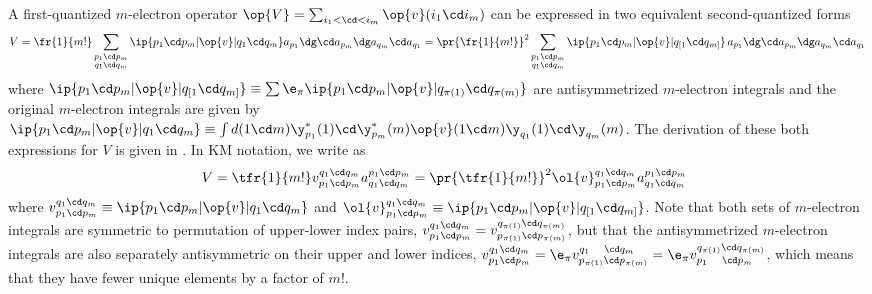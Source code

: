 \documentclass[11pt,fleqn]{article}
\numberwithin{equation}{section}
\begin{document}
\begin{rmk}
A first-quantized $m$-electron operator $\op{V}=\sum_{i_1<\cd<i_m}\op{v}(i_1\cd i_m)$ can be expressed in two equivalent second-quantized forms
\begin{align}\label{m-electron-operator-expressions}
  V
=
  \fr{1}{m!}
  \sum_{\substack{p_1\cd p_m\\q_1\cd q_m}}
  \ip{p_1\cd p_m|\op{v}|q_1\cd q_m}
  a_{p_1}\dg\cd a_{p_m}\dg a_{q_m}\cd a_{q_1}
=
  \pr{\fr{1}{m!}}^2
  \sum_{\substack{p_1\cd p_m\\q_1\cd q_m}}
  \ip{p_1\cd p_m|\op{v}|q_{[1}\cd q_{m]}}\,
  a_{p_1}\dg\cd a_{p_m}\dg
  a_{q_m}\cd a_{q_1}
\end{align}
where
$
  \ip{p_1\cd p_m|\op{v}|q_{[1}\cd q_{m]}}
\equiv
  \sum
  \e_{\pi}
  \ip{p_1\cd p_m|\op{v}|q_{\pi(1)}\cd q_{\pi(m)}}
$
are antisymmetrized $m$-electron integrals
and the original $m$-electron integrals are given by
$\ip{p_1\cd p_m|\op{v}|q_1\cd q_m}\equiv\int d(1\cd m)\y_{p_1}^*(1)\cd \y_{p_m}^*(m)\op{v}(1\cd m)\y_{q_1}(1)\cd \y_{q_m}(m)$.
The derivation of these both expressions for $V$ is given in .
In KM notation, we write  as
\begin{align}
&&
  V
=
  \tfr{1}{m!}
  v_{p_1\cd p_m}^{q_1\cd q_m}
  a^{p_1\cd p_m}_{q_1\cd q_m}
=
  \pr{\tfr{1}{m!}}^2
  \ol{v}_{p_1\cd p_m}^{q_1\cd q_m}
  a^{p_1\cd p_m}_{q_1\cd q_m}
\end{align}
where $v_{p_1\cd p_m}^{q_1\cd q_m}\equiv\ip{p_1\cd p_m|\op{v}|q_1\cd q_m}$ and
$\ol{v}_{p_1\cd p_m}^{q_1\cd q_m}\equiv\ip{p_1\cd p_m|\op{v}|q_{[1}\cd q_{m]}}$.
Note that both sets of $m$-electron integrals are symmetric to permutation of upper-lower index pairs, $v_{p_1\cd p_m}^{q_1\cd q_m}=v_{p_{\pi(1)}\cd p_{\pi(m)}}^{q_{\pi(1)}\cd q_{\pi(m)}}$,
but that the antisymmetrized $m$-electron integrals are also separately antisymmetric on their upper and lower indices,
$
  v_{p_1\cd p_m}^{q_1\cd q_m}
=
  \e_{\pi}
  v_{p_{\pi(1)}\cd p_{\pi(m)}}^{q_1\hphantom{_{\pi()}}\cd q_m}
=
  \e_{\pi}
  v_{p_1\hphantom{_{\pi()}}\cd p_m}^{q_{\pi(1)}\cd q_{\pi(m)}}
$,
which means that they have fewer unique elements by a factor of $m!$.
\end{rmk}
\end{document}
